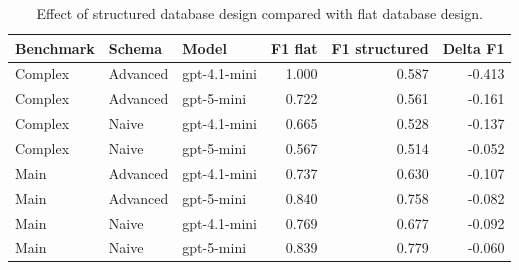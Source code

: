 \begin{table}[htbp]
\centering
\small
\caption{Effect of structured database design compared with flat database design.}
\label{tab:structure-effect}
\begin{tabular}{lllrrr}
\toprule
Benchmark & Schema & Model & F1 flat & F1 structured & Delta F1 \\
\midrule
Complex & Advanced & gpt-4.1-mini & 1.000 & 0.587 & -0.413 \\
Complex & Advanced & gpt-5-mini & 0.722 & 0.561 & -0.161 \\
Complex & Naive & gpt-4.1-mini & 0.665 & 0.528 & -0.137 \\
Complex & Naive & gpt-5-mini & 0.567 & 0.514 & -0.052 \\
Main & Advanced & gpt-4.1-mini & 0.737 & 0.630 & -0.107 \\
Main & Advanced & gpt-5-mini & 0.840 & 0.758 & -0.082 \\
Main & Naive & gpt-4.1-mini & 0.769 & 0.677 & -0.092 \\
Main & Naive & gpt-5-mini & 0.839 & 0.779 & -0.060 \\
\bottomrule
\end{tabular}
\end{table}

